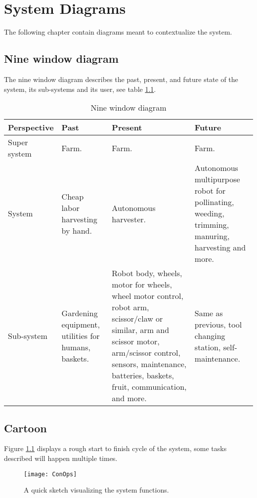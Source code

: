 \documentclass[%
oneside,    %
project,    %
nosummary   %
]{USN-MSc}
\begin{document}
\chapter{System Diagrams}
\label{ch:diagrams}
The following chapter contain diagrams meant to contextualize the system.

\section{Nine window diagram}
\label{sec:nineWindow}
The nine window diagram describes the past, present, and future state of the system, its sub-systems and its user, see table \ref{tab:nineWindow}.
\begin{table}[!ht]
  \caption{Nine window diagram}
   \centering
    \begin{tabular}{ | m{3cm} | m{3cm} | m{3cm} | m{5cm} |}
     \hline
     Perspective 
     & Past 
     & Present 
     & Future \\ \hline
     Super system 
     & Farm. 
     & Farm. 
     & Farm. \\ \hline
     System 
     & Cheap labor harvesting by hand. 
     & Autonomous harvester. 
     & Autonomous multipurpose robot for pollinating, weeding, trimming, manuring, harvesting and more. \\ \hline
     Sub-system 
     & Gardening equipment, utilities for humans, baskets. 
     & Robot body, wheels, motor for wheels, wheel motor control, robot arm, scissor/claw or similar, arm and scissor motor, arm/scissor control, sensors, maintenance, batteries, baskets, fruit, communication, and more.
     & Same as previous, tool changing station, self-maintenance.\\ \hline
     \end{tabular}
     \label{tab:nineWindow}
 \end{table}

\section{Cartoon}
\label{sec:cartoon}

Figure \ref{fig:cartoon} displays a rough start to finish cycle of the system, some tasks described will happen multiple times.

\begin{figure}[!ht]
  \centering
  \texttt{[image: ConOps]}
  \caption{A quick sketch visualizing the system functions.}
  \label{fig:cartoon}
\end{figure}
\end{document}
